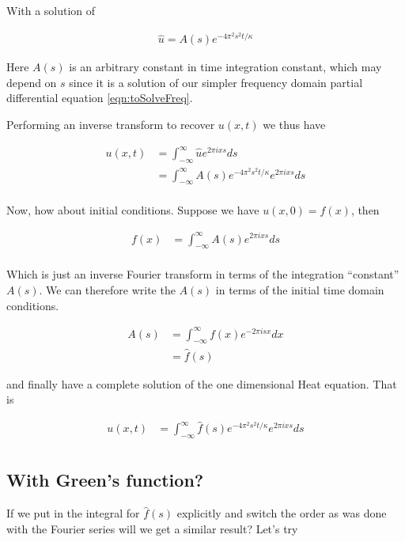 \documentclass{article}
\newcommand{\IIinf}[0]{ \int_{-\infty}^\infty }
\begin{document}
With a solution of

\begin{align*}
\hat{u} = A(s) e^{ -4 \pi^2 s^2 t/ \kappa }
\end{align*}

Here $A(s)$ is an arbitrary constant in time integration constant, which may depend on $s$ since it is a solution of our simpler frequency domain partial differential equation
\ref{eqn:toSolveFreq}.

Performing an inverse transform to recover $u(x,t)$ we thus have

\begin{align*}
u(x,t) 
&= 
\IIinf \hat{u} e^{2 \pi i x s } ds  \\
&= 
\IIinf A(s) e^{ -4 \pi^2 s^2 t/ \kappa } e^{2 \pi i x s } ds  \\
\end{align*}

Now, how about initial conditions.  Suppose we have $u(x,0) = f(x)$, then 

\begin{align*}
f(x) &= 
\IIinf A(s) e^{2 \pi i x s } ds \\
\end{align*}

Which is just an inverse Fourier transform in terms of the integration ``constant'' $A(s)$.  We can therefore write the $A(s)$ in terms of the
initial time domain conditions.

\begin{align*}
A(s) &= 
\IIinf f(x) e^{-2 \pi i s x } dx \\
&= \hat{f}(s)
\end{align*}

and finally have a complete solution of the one dimensional Heat equation.  That is

\begin{align*}
u(x,t) &= 
\IIinf \hat{f}(s) e^{ -4 \pi^2 s^2 t/ \kappa } e^{2 \pi i x s } ds  \\
\end{align*}

\subsection{ With Green's function? }

If we put in the integral for $\hat{f}(s)$ explicitly and switch the order as was done with the Fourier series will we get a similar result?   Let's try
\end{document}
